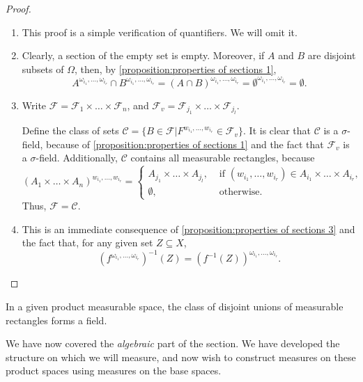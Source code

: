 \begin{proof}
\begin{enumerate}
    \item This proof is a simple verification of quantifiers. We will omit it.
    \item Clearly, a section of the empty set is empty. Moreover, if \(A\) and \(B\) are disjoint subsets of \(\Omega\), then, by 
        \ref{proposition:properties of sections 1}, \[A^{\omega_{i_1},\dots,\omega_{i_r}}\cap B^{\omega_{i_1},\dots,\omega_{i_r}}=(A\cap B)^{\omega_{i_1},\dots,\omega_{i_r}}=\emptyset^{\omega_{i_1},\dots,\omega_{i_r}}=\emptyset.\]
    \item Write \(\mathcal{F}=\mathcal{F}_1\times\dotsc\times\mathcal{F}_n\),
  and \(\mathcal{F}_{v}=\mathcal{F}_{j_1}\times \dotsc\times\mathcal{F}_{j_l}\).

  Define the class of sets \(\mathcal{C}=\{B\in\mathcal{F}|F^{w_{i_1},\dotsc,w_{i_r}}\in\mathcal{F}_v\}\).
  It is clear that \(\mathcal{C}\) is a \(\sigma\)-field, because of \ref{proposition:properties of sections 1} and the fact that \(\mathcal{F}_{v}\) is a \(\sigma\)-field. Additionally, \(\mathcal{C}\) contains all measurable rectangles, because
  \[(A_{1}\times\dotsc\times A_n)^{w_{i_1},\dotsc,w_{i_r}}=\left\{
          \begin{array}{rl}
              A_{j_1}\times\dotsc\times A_{j_l}, & \text{ if } (w_{i_1},\dotsc,w_{i_r})\in A_{i_1}\times\dotsc\times A_{i_r},\\
              \emptyset, & \text{ otherwise.}
      \end{array}\right.\]
Thus, \(\mathcal{F}=\mathcal{C}\).
\item This is an immediate consequence of \ref{proposition:properties of sections 3} and the fact that, for any given set \(Z\subseteq X\),
    \[
        \left(
        f^{\omega_{i_{1}}, \dots , \omega_{i_{r}}}
        \right)^{-1}(Z)=\left(f^{-1}(Z)\right)^{\omega_{i_{1}}, \dots , \omega_{i_{r}}}
    .\]
\end{enumerate}
\end{proof}
\begin{remk}
In a given product measurable space, the class of disjoint unions of measurable rectangles forms a field.
\end{remk}

We have now covered the \emph{algebraic} part of the section. We have developed the structure on which we will measure, and now wish to construct measures on these product spaces using measures on the base spaces.

